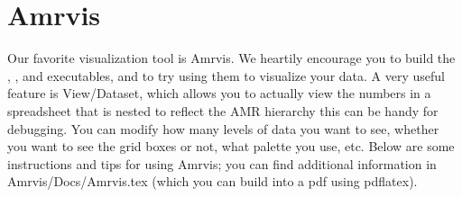 \documentclass[letterpaper,10pt,english]{sphinxmanual}
\begin{document}
\section{Amrvis}
\label{\detokenize{Visualization:amrvis}}\label{\detokenize{Visualization:sec-amrvis}}\label{\detokenize{Visualization::doc}}
\sphinxAtStartPar
Our favorite visualization tool is Amrvis. We heartily encourage you to build
the , , and  executables, and to try using
them to visualize your data. A very useful feature is View/Dataset, which
allows you to actually view the numbers in a spreadsheet that is nested to
reflect the AMR hierarchy \textendash{} this can be handy for debugging. You can modify how
many levels of data you want to see, whether you want to see the grid boxes or
not, what palette you use, etc. Below are some instructions and tips for using
Amrvis; you can find additional information in Amrvis/Docs/Amrvis.tex (which
you can build into a pdf using pdflatex).
\end{document}
